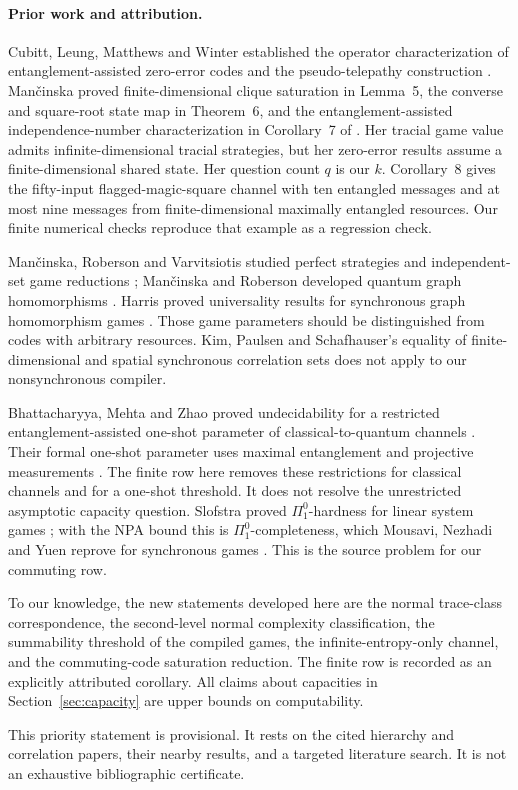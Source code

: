 \paragraph{Prior work and attribution.}
Cubitt, Leung, Matthews and Winter established the operator characterization of entanglement-assisted zero-error codes and the pseudo-telepathy construction \cite{CLMW}. Man\v{c}inska proved finite-dimensional clique saturation in Lemma~5, the converse and square-root state map in Theorem~6, and the entanglement-assisted independence-number characterization in Corollary~7 of \cite{Mancinska}. Her tracial game value admits infinite-dimensional tracial strategies, but her zero-error results assume a finite-dimensional shared state. Her question count $q$ is our $k$. Corollary~8 gives the fifty-input flagged-magic-square channel with ten entangled messages and at most nine messages from finite-dimensional maximally entangled resources. Our finite numerical checks reproduce that example as a regression check.

Man\v{c}inska, Roberson and Varvitsiotis studied perfect strategies and independent-set game reductions \cite{MRV}; Man\v{c}inska and Roberson developed quantum graph homomorphisms \cite{MR}. Harris proved universality results for synchronous graph homomorphism games \cite{Harris}. Those game parameters should be distinguished from codes with arbitrary resources. Kim, Paulsen and Schafhauser's equality of finite-dimensional and spatial synchronous correlation sets \cite{KPS} does not apply to our nonsynchronous compiler.

Bhattacharyya, Mehta and Zhao proved undecidability for a restricted entanglement-assisted one-shot parameter of classical-to-quantum channels \cite{BMZ}. Their formal one-shot parameter uses maximal entanglement and projective measurements \cite[Definition~2.3]{BMZ}. The finite row here removes these restrictions for classical channels and for a one-shot threshold. It does not resolve the unrestricted asymptotic capacity question. Slofstra proved $\Pi^0_1$-hardness for linear system games \cite{Slofstra}; with the NPA bound this is $\Pi^0_1$-completeness, which Mousavi, Nezhadi and Yuen reprove for synchronous games \cite[Theorem~6.4]{MNY}. This is the source problem for our commuting row.

To our knowledge, the new statements developed here are the normal trace-class correspondence, the second-level normal complexity classification, the summability threshold of the compiled games, the infinite-entropy-only channel, and the commuting-code saturation reduction. The finite row is recorded as an explicitly attributed corollary. All claims about capacities in Section~\ref{sec:capacity} are upper bounds on computability.

This priority statement is provisional. It rests on the cited hierarchy and correlation papers, their nearby results, and a targeted literature search. It is not an exhaustive bibliographic certificate.
